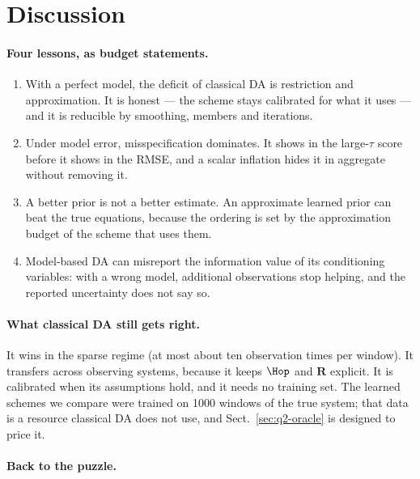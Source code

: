 \section{Discussion}\label{sec:discussion}

\paragraph{Four lessons, as budget statements.}
\begin{enumerate}[label=(\alph*),leftmargin=*]
  \item With a perfect model, the deficit of classical DA is restriction and
    approximation. It is honest --- the scheme stays calibrated for what it uses
    --- and it is reducible by smoothing, members and iterations.
  \item Under model error, misspecification dominates. It shows in the
    large-$\tau$ score before it shows in the RMSE, and a scalar inflation hides
    it in aggregate without removing it.
  \item A better prior is not a better estimate. An approximate learned prior
    can beat the true equations, because the ordering is set by the
    approximation budget of the scheme that uses them.
  \item Model-based DA can misreport the information value of its conditioning
    variables: with a wrong model, additional observations stop helping, and the
    reported uncertainty does not say so.
\end{enumerate}

\paragraph{What classical DA still gets right.}
It wins in the sparse regime (at most about ten observation times per window).
It transfers across observing systems, because it keeps $\Hop$ and $\mathbf{R}$
explicit. It is calibrated when its assumptions hold, and it needs no training
set. The learned schemes we compare were trained on 1000 windows of the true
system; that data is a resource classical DA does not use, and
Sect.~\ref{sec:q2-oracle} is designed to price it.

\paragraph{Back to the puzzle.}

